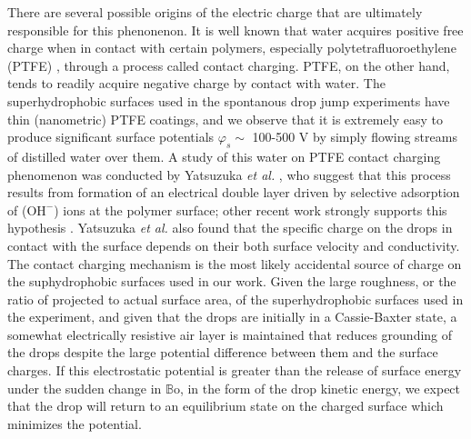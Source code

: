 \documentclass[12pt,a4paper,oneside]{book}
\begin{document}
There are several possible origins of the electric charge that are ultimately responsible for this phenonenon. It is well known that water acquires positive free charge when in contact with certain polymers, especially polytetrafluoroethylene (PTFE) \cite{langmuir_surface_1938}, through a process called contact charging. PTFE, on the other hand, tends to readily acquire negative charge by contact with water. The superhydrophobic surfaces used in the spontanous drop jump experiments have thin (nanometric) PTFE coatings, and we observe that it is extremely easy to produce significant surface potentials $\varphi_s \sim$ 100-500 V by simply flowing streams of distilled water over them. A study of this water on PTFE contact charging phenomenon was conducted by Yatsuzuka \emph{et al.} \cite{yatsuzuka_electrification_1994}, who suggest that this process results from formation of an electrical double layer driven by selective adsorption of ($\mbox{OH}^-$) ions at the polymer surface; other recent work strongly supports this hypothesis \cite{beattie_intrinsic_2006, strazdaite_water_2015}. Yatsuzuka \emph{et al.} also found that the specific charge on the drops in contact with the surface depends on their both surface velocity and conductivity. The contact charging mechanism is the most likely accidental source of charge on the suphydrophobic surfaces used in our work. Given the large roughness, or the ratio of projected to actual surface area, of the superhydrophobic surfaces used in the experiment, and given that the drops are initially in a Cassie-Baxter state, a somewhat electrically resistive air layer is maintained that reduces grounding of the drops despite the large potential difference between them and the surface charges. If this electrostatic potential is greater than the release of surface energy under the sudden change in $\mathbb{B}\mbox{o}$, in the form of the drop kinetic energy, we expect that the drop will return to an equilibrium state on the charged surface which minimizes the potential.
\end{document}
